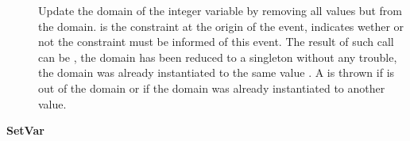 \begin{description}
\item[ ]  

Update the domain of the integer variable by removing all values but  from the domain.  is the constraint at the origin of the event,  indicates wether or not the  constraint must be informed of this event. The result of such call can be , the domain has been reduced to a singleton without any trouble,  the domain was already instantiated to the same value . A  is thrown if  is out of the domain or if the domain was already instantiated to another value.

\end{description}

\vspace{0.5cm}
\textbf{SetVar}

